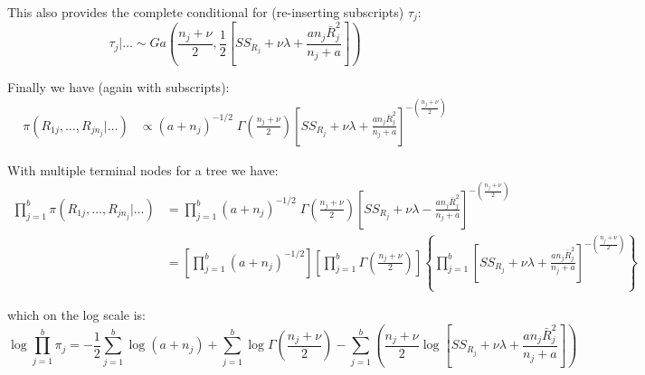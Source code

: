 \documentclass{article}
\begin{document}
This also provides the complete conditional for (re-inserting subscripts) $\tau_j$:
$$\tau_j |\ldots \sim Ga \left( \frac{n_j + \nu}{2} , \frac{1}{2} \left[ SS_{R_j} + \nu \lambda + \frac{an_j\bar{R}_j^2}{n_j+a} \right] \right)$$

Finally we have (again with subscripts):
\begin{align*}
\pi(R_{1j}, \ldots, R_{jn_j}| \ldots ) &\propto (a+n_j)^{-1/2} \; \Gamma \left( \frac{n_j + \nu}{2} \right) \left[SS_{R_j} + \nu \lambda + \frac{an_j\bar{R}_j^2}{n_j + a} \right]^{-\left( \frac{n_j + \nu}{2} \right)}
\end{align*}

With multiple terminal nodes for a tree we have:
\begin{align*}
\prod_{j=1}^b \pi(R_{1j}, \ldots, R_{jn_j}| \ldots ) &= \prod_{j=1}^b (a+n_j)^{-1/2} \; \Gamma \left( \frac{n_j + \nu}{2} \right) \left[SS_{R_j} + \nu \lambda - \frac{an_j\bar{R}_j^2}{n_j + a} \right]^{-(\frac{n_j + \nu}{2})} \\
&= \left[ \prod_{j=1}^b (a+n_j)^{-1/2} \right] \left[ \prod_{j=1}^b \Gamma \left( \frac{n_j + \nu}{2} \right) \right] \left\{ \prod_{j=1}^b \left[SS_{R_j} + \nu \lambda + \frac{an_j\bar{R}_j^2}{n_j + a} \right]^{-\left( \frac{n_j + \nu}{2} \right)} \right\}
\end{align*}

which on the log scale is:
$$\log \prod_{j=1}^b \pi_j = -\frac{1}{2} \sum_{j=1}^b \log(a + n_j) + \sum_{j=1}^b \log \Gamma \left( \frac{n_j + \nu}{2} \right) - \sum_{j=1}^b \left( \frac{n_j + \nu}{2} \log \left[SS_{R_j} + \nu \lambda + \frac{an_j\bar{R}_j^2}{n_j + a} \right] \right) $$
\end{document}
